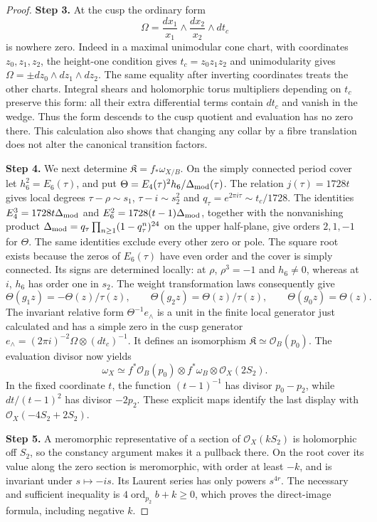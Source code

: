 \documentclass[11pt,a4paper]{article}
\theoremstyle{plain}
\theoremstyle{definition}
\begin{document}
\begin{proof}
\par\smallskip\noindent\textbf{Step 3.} At the cusp the ordinary form
\[
 \Omega=\frac{dx_1}{x_1}\wedge\frac{dx_2}{x_2}\wedge dt_c
\]
is nowhere zero. Indeed in a maximal unimodular cone chart, with coordinates $z_0,z_1,z_2$, the height-one condition gives $t_c=z_0z_1z_2$ and unimodularity gives $\Omega=\pm dz_0\wedge dz_1\wedge dz_2$. The same equality after inverting coordinates treats the other charts. Integral shears and holomorphic torus multipliers depending on $t_c$ preserve this form: all their extra differential terms contain $dt_c$ and vanish in the wedge. Thus the form descends to the cusp quotient and evaluation has no zero there. This calculation also shows that changing any collar by a fibre translation does not alter the canonical transition factors.

\par\smallskip\noindent\textbf{Step 4.} We next determine $\mathfrak K=f_*\omega_{X/B}$. On the simply connected period cover let $h_6^2=E_6(\tau)$, and put $\Theta=E_4(\tau)^2h_6/\Delta_{\rm mod}(\tau)$. The relation $j(\tau)=1728t$ gives local degrees $\tau-\rho\sim s_1$, $\tau-i\sim s_2^2$ and $q_\tau=e^{2\pi i\tau}\sim t_c/1728$. The identities $E_4^3=1728t\Delta_{\rm mod}$ and $E_6^2=1728(t-1)\Delta_{\rm mod}$, together with the nonvanishing product $\Delta_{\rm mod}=q_\tau\prod_{n\ge1}(1-q_\tau^n)^{24}$ on the upper half-plane, give orders $2,1,-1$ for $\Theta$. The same identities exclude every other zero or pole. The square root exists because the zeros of $E_6(\tau)$ have even order and the cover is simply connected. Its signs are determined locally: at $\rho$, $\rho^3=-1$ and $h_6\ne0$, whereas at $i$, $h_6$ has order one in $s_2$. The weight transformation laws consequently give
\[
 \Theta(g_1z)=-\Theta(z)/\tau(z),\qquad
 \Theta(g_2z)=\Theta(z)/\tau(z),\qquad \Theta(g_0z)=\Theta(z).
\]
The invariant relative form $\Theta^{-1}e_\wedge$ is a unit in the finite local generator just calculated and has a simple zero in the cusp generator $e_\wedge=(2\pi i)^{-2}\Omega\otimes(dt_c)^{-1}$. It defines an isomorphism $\mathfrak K\simeq\mathcal O_B(p_0)$. The evaluation divisor now yields
\[
 \omega_X\simeq f^*\mathcal O_B(p_0)\otimes f^*\omega_B\otimes\mathcal O_X(2S_2).
\]
In the fixed coordinate $t$, the function $(t-1)^{-1}$ has divisor $p_0-p_2$, while $dt/(t-1)^2$ has divisor $-2p_2$. These explicit maps identify the last display with $\mathcal O_X(-4S_2+2S_2)$.

\par\smallskip\noindent\textbf{Step 5.} A meromorphic representative of a section of $\mathcal O_X(kS_2)$ is holomorphic off $S_2$, so the constancy argument makes it a pullback there. On the root cover its value along the zero section is meromorphic, with order at least $-k$, and is invariant under $s\mapsto-is$. Its Laurent series has only powers $s^{4r}$. The necessary and sufficient inequality is $4\operatorname{ord}_{p_2}b+k\ge0$, which proves the direct-image formula, including negative $k$.


\end{proof}
\end{document}
